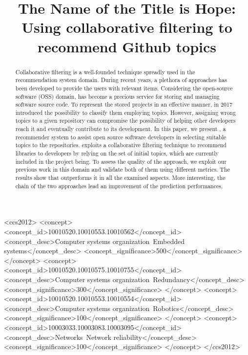 \documentclass[sigconf]{acmart}
\begin{document}
\title{The Name of the Title is Hope}

\title{\CT: Using collaborative filtering to recommend Github topics}








\begin{abstract}
Collaborative filtering is a well-founded technique spreadly used in the recommendation system domain. During recent years, a plethora of approaches has been developed to provide the users with relevant items. Considering the open-source software (OSS) domain, \GH has become a precious service for storing and managing software source code. To represent the stored projects in an effective manner, in 2017 \GH introduced the possibility to classify them employing topics. However, assigning wrong topics to a given repository can compromise the possibility of helping other developers reach it and eventually contribute to its development.
In this paper, we present \CT, a recommender system to assist open source software developers in selecting suitable topics to the repositories. \CT exploits a collaborative filtering technique to recommend libraries to developers by relying on the set of initial topics, which are currently included in the project being. To assess the quality of the approach, we exploit our previous work in this domain and validate both of them using different metrics. The results show that \CT outperforms it in all the examined aspects. More interesting, the chain of the two approaches lead an improvement of the prediction performances.
\end{abstract}

\begin{CCSXML}
<ccs2012>
 <concept>
  <concept_id>10010520.10010553.10010562</concept_id>
  <concept_desc>Computer systems organization~Embedded systems</concept_desc>
  <concept_significance>500</concept_significance>
 </concept>
 <concept>
  <concept_id>10010520.10010575.10010755</concept_id>
  <concept_desc>Computer systems organization~Redundancy</concept_desc>
  <concept_significance>300</concept_significance>
 </concept>
 <concept>
  <concept_id>10010520.10010553.10010554</concept_id>
  <concept_desc>Computer systems organization~Robotics</concept_desc>
  <concept_significance>100</concept_significance>
 </concept>
 <concept>
  <concept_id>10003033.10003083.10003095</concept_id>
  <concept_desc>Networks~Network reliability</concept_desc>
  <concept_significance>100</concept_significance>
 </concept>
</ccs2012>
\end{CCSXML}
\end{document}

